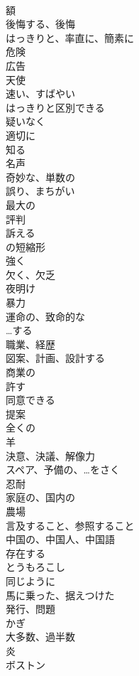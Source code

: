 \documentclass[8pt]{extreport}
\begin{document}
\begin{CJK}{UTF8}{min}
\\	額	
\\	後悔する、後悔	
\\	はっきりと、率直に、簡素に	
\\	危険	
\\	広告	
\\	天使	
\\	速い、すばやい	
\\	はっきりと区別できる	
\\	疑いなく	
\\	適切に	
\\	知る	
\\	名声	
\\	奇妙な、単数の	
\\	誤り、まちがい	
\\	最大の	
\\	評判	
\\	訴える	
\\	の短縮形	
\\	強く	
\\	欠く、欠乏	
\\	夜明け	
\\	暴力	
\\	運命の、致命的な	
\\	…する	
\\	職業、経歴	
\\	図案、計画、設計する	
\\	商業の	
\\	許す	
\\	同意できる	
\\	提案	
\\	全くの	
\\	羊	
\\	決意、決議、解像力	
\\	スペア、予備の、…をさく	
\\	忍耐	
\\	家庭の、国内の	
\\	農場	
\\	言及すること、参照すること	
\\	中国の、中国人、中国語	
\\	存在する	
\\	とうもろこし	
\\	同じように	
\\	馬に乗った、据えつけた	
\\	発行、問題	
\\	かぎ	
\\	大多数、過半数	
\\	炎	
\\	ボストン	

\end{CJK}
\end{document}
